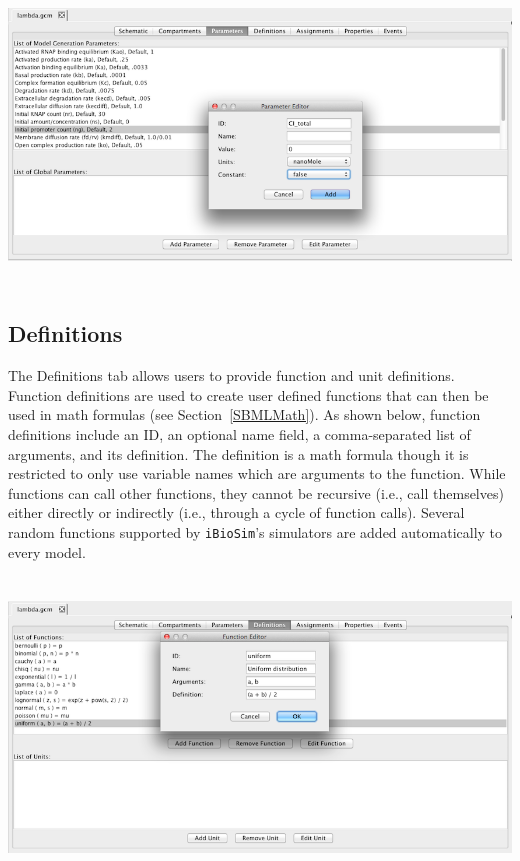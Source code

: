 \documentclass[titlepage,11pt]{article}
\begin{document}
\begin{center}
\includegraphics[height=80mm]{screenshots/parameter}
\end{center}

\subsection{\label{Definitions}Definitions}

\noindent
The Definitions tab allows users to provide function and unit definitions. Function definitions are used to create user defined functions that can then be used in math formulas (see Section~\ref{SBMLMath}).  As shown below, function definitions include an ID, an optional name field, a comma-separated list of arguments, and its definition.  The definition is a math formula though it is restricted to only use variable names which are arguments to the function.  While functions can call other functions, they cannot be recursive (i.e., call themselves) either directly or indirectly (i.e., through a cycle of function calls).  Several random functions supported by {\tt iBioSim}'s simulators are added automatically to every model.

\begin{center}
\includegraphics[height=80mm]{screenshots/function}
\end{center}
\end{document}

